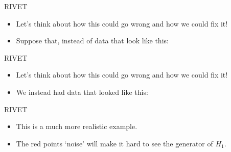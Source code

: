 \begin{frame}{RIVET}
\begin{itemize}
\item<1-> Let's think about how this could go wrong and how we could fix it!
\item<2-> Suppose that, instead of data that look like this:
\begin{figure}
\end{figure} 
\end{itemize}
\end{frame}
\begin{frame}{RIVET}
\begin{itemize}
\item Let's think about how this could go wrong and how we could fix it!
\item We instead had data that looked like this:
\begin{figure}
\end{figure} 
\end{itemize}
\end{frame}
\begin{frame}{RIVET}
\begin{itemize}
\item This is a much more realistic example.
\item The red points `noise' will make it hard to see the generator of $H_1$.
\begin{figure}
\end{figure} 
\end{itemize}
\end{frame}
